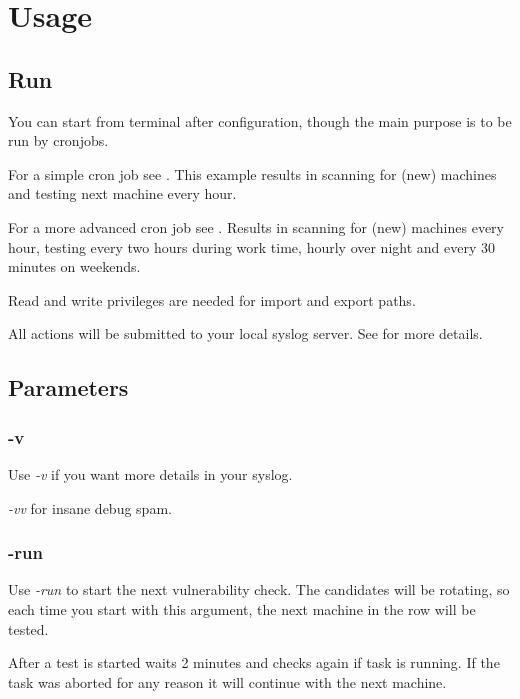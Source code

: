 \section{Usage}

\breakpoint\subsection{Run \sw}

You can start \sw from terminal after configuration, though the main purpose is to be run by cronjobs.

For a simple cron job see . This example results in scanning for (new) machines and testing next machine every hour.


For a more advanced cron job see . Results in scanning for (new) machines every hour, testing every two hours during work time, hourly over night and every 30 minutes on weekends.


\warn Read and write privileges are needed for import and export paths.

\hint All actions will be submitted to your local syslog server. See  for more details.
 

\clearpage
\breakpoint\subsection{Parameters}\label{sec:parameters}

\breakpoint\subsubsection*{-v}\label{sec:verbose}
Use \emph{-v} if you want more details in your syslog.

\emph{-vv} for insane debug spam.

\breakpoint\subsubsection*{-run}
Use \emph{-run} to start the next vulnerability check. The candidates will be rotating, so each time you start \sw with this argument, the next machine in the row will be tested.

After a test is started \sw waits 2 minutes and checks again if task is running. If the task was aborted for any reason it will continue with the next machine.

